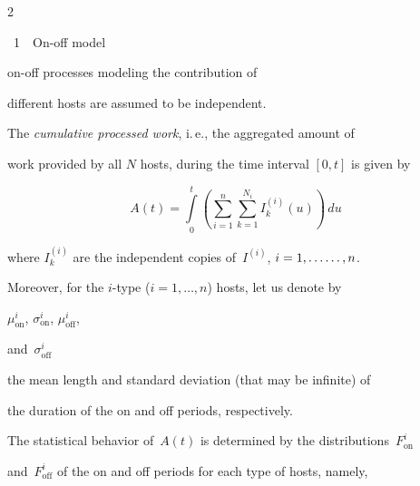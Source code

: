 \begin{multicols}{2}
{\begin{center}
\vspace*{6pt}





\noindent

{{\figurename~1}\ \ \small{On-off model}}

\end{center}

}






\addtocounter{figure}{1}





\noindent

on-off processes modeling the contribution of 

different hosts are assumed to be independent.







The \textit{cumulative processed work}, i.\,e., the aggregated amount of  

work provided by all $N$ hosts, during the time interval $[0,t]$ is given by

$$

A(t)=\int\limits_0^{t} \left( {\sum\limits_{i=1}^n\sum\limits_{k=1}^{N_i} 

{I_{k}^{(i)}(u)} } \right)\,du

$$

where $I_k^{(i)}$ are the independent copies of~$I^{(i)}$, $i=1,\ldots\linebreak \ldots,n$. 

Moreover, for the $i$-type ($i=1,\dots,n$) hosts, let us denote by

$\mu_{\mathrm{on}}^i$, $\sigma_{\mathrm{on}}^i$, $\mu_{\mathrm{off}}^i$, 

and~$\sigma_{\mathrm{off}}^i$

the mean length and  standard deviation (that may be infinite) of 

the duration of the  on and  off periods, respectively.





The statistical behavior of~$A(t)$ is determined by the distributions~$F_{\mathrm{on}}^i$ 

and~$F_{\mathrm{off}}^i$ of the on and off periods for each type of hosts, namely,


\end{multicols}
